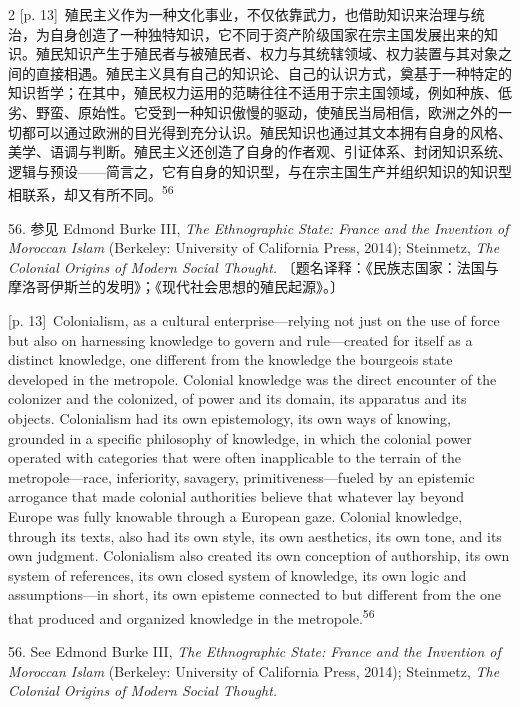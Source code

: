 \documentclass[10pt,a4paper]{article}
\begin{document}
\begin{paracol}{2}
{\scriptsize\color{gray} [p. 13]}\ 殖民主义作为一种文化事业，不仅依靠武力，也借助知识来治理与统治，为自身创造了一种独特知识，它不同于资产阶级国家在宗主国发展出来的知识。殖民知识产生于殖民者与被殖民者、权力与其统辖领域、权力装置与其对象之间的直接相遇。殖民主义具有自己的知识论、自己的认识方式，奠基于一种特定的知识哲学；在其中，殖民权力运用的范畴往往不适用于宗主国领域，例如种族、低劣、野蛮、原始性。它受到一种知识傲慢的驱动，使殖民当局相信，欧洲之外的一切都可以通过欧洲的目光得到充分认识。殖民知识也通过其文本拥有自身的风格、美学、语调与判断。殖民主义还创造了自身的作者观、引证体系、封闭知识系统、逻辑与预设——简言之，它有自身的知识型，与在宗主国生产并组织知识的知识型相联系，却又有所不\mbox{同。\textsuperscript{56}}\par{\small 56. 参见 Edmond Burke III, \textit{The Ethnographic State: France and the Invention of Moroccan Islam} (Berkeley: University of California Press, 2014); Steinmetz, \textit{The Colonial Origins of Modern Social Thought.} 〔题名译释：《民族志国家：法国与摩洛哥伊斯兰的发明》；《现代社会思想的殖民起源》。〕\par}
\switchcolumn
{\scriptsize\color{gray} [p. 13]}\ Colonialism, as a cultural enterprise—relying not just on the use of force but also on harnessing knowledge to govern and rule—created for itself as a distinct knowledge, one different from the knowledge the bourgeois state developed in the metropole. Colonial knowledge was the direct encounter of the colonizer and the colonized, of power and its domain, its apparatus and its objects. Colonialism had its own epistemology, its own ways of knowing, grounded in a specific philosophy of knowledge, in which the colonial power operated with categories that were often inapplicable to the terrain of the metropole—race, inferiority, savagery, primitiveness—fueled by an epistemic arrogance that made colonial authorities believe that whatever lay beyond Europe was fully knowable through a European gaze. Colonial knowledge, through its texts, also had its own style, its own aesthetics, its own tone, and its own judgment. Colonialism also created its own conception of authorship, its own system of references, its own closed system of knowledge, its own logic and assumptions—in short, its own episteme connected to but different from the one that produced and organized knowledge in the metropole.\nobreak\textsuperscript{56}\par{\small 56. See Edmond Burke III, \textit{The Ethnographic State: France and the Invention of Moroccan Islam} (Berkeley: University of California Press, 2014); Steinmetz, \textit{The Colonial Origins of Modern Social Thought.}\par}

\end{paracol}
\end{document}
